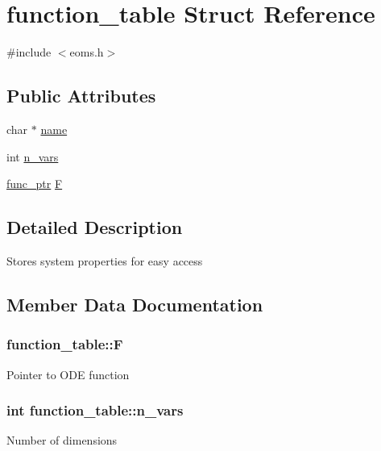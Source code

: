 \hypertarget{structfunction__table}{}\section{function\+\_\+table Struct Reference}
\label{structfunction__table}


{\ttfamily \#include $<$eoms.\+h$>$}

\subsection*{Public Attributes}
\begin{DoxyCompactItemize}
\item 
char $\ast$ \hyperlink{structfunction__table_a99650448c98f34476adf6caf60a22df2}{name}
\item 
int \hyperlink{structfunction__table_ae4e3f9023fbce759fc423e921e51d43f}{n\+\_\+vars}
\item 
\hyperlink{eoms_8h_ad41a7f3074b4b25351cbe9978efa090a}{func\+\_\+ptr} \hyperlink{structfunction__table_a9788c2e52edde5a8e37d1e7b4ea6b234}{F}
\end{DoxyCompactItemize}


\subsection{Detailed Description}
Stores system properties for easy access 

\subsection{Member Data Documentation}
\hypertarget{structfunction__table_a9788c2e52edde5a8e37d1e7b4ea6b234}{}
\subsubsection[{F}]{ function\+\_\+table\+::\+F}\label{structfunction__table_a9788c2e52edde5a8e37d1e7b4ea6b234}
Pointer to O\+D\+E function \hypertarget{structfunction__table_ae4e3f9023fbce759fc423e921e51d43f}{}
\subsubsection[{n\+\_\+vars}]{\setlength{\rightskip}{0pt plus 5cm}int function\+\_\+table\+::n\+\_\+vars}\label{structfunction__table_ae4e3f9023fbce759fc423e921e51d43f}
Number of dimensions \hypertarget{structfunction__table_a99650448c98f34476adf6caf60a22df2}{}
